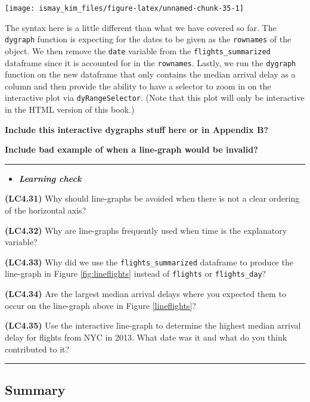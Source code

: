 \documentclass[]{tufte-book}
\newenvironment{rmdblock}[1]
  {\begin{shaded*}
  \begin{itemize}
  \renewcommand{\labelitemi}{
    \raisebox{-.7\height}[0pt][0pt]{
    }
  }
  \item
  }
  {
  \end{itemize}
  \end{shaded*}
  }
\newenvironment{learncheck}
  {\begin{rmdblock}{warning}}
  {\end{rmdblock}}
\begin{document}
\texttt{[image: ismay\_kim\_files/figure-latex/unnamed-chunk-35-1]}

The syntax here is a little different than what we have covered so far.
The \texttt{dygraph} function is expecting for the dates to be given as
the \texttt{rownames} of the object. We then remove the \texttt{date}
variable from the \texttt{flights\_summarized} dataframe since it is
accounted for in the \texttt{rownames}. Lastly, we run the
\texttt{dygraph} function on the new dataframe that only contains the
median arrival delay as a column and then provide the ability to have a
selector to zoom in on the interactive plot via
\texttt{dyRangeSelector}. (Note that this plot will only be interactive
in the HTML version of this book.)

\textbf{Include this interactive dygraphs stuff here or in Appendix B?}

\textbf{Include bad example of when a line-graph would be invalid?}

\begin{center}\rule{0.5\linewidth}{\linethickness}\end{center}

\begin{learncheck}
\textbf{\emph{Learning check}}
\end{learncheck}

\textbf{(LC4.31)} Why should line-graphs be avoided when there is not a
clear ordering of the horizontal axis?

\textbf{(LC4.32)} Why are line-graphs frequently used when time is the
explanatory variable?

\textbf{(LC4.33)} Why did we use the \texttt{flights\_summarized}
dataframe to produce the line-graph in Figure \ref{fig:lineflights}
instead of \texttt{flights} or \texttt{flights\_day}?

\textbf{(LC4.34)} Are the largest median arrival delays where you
expected them to occur on the line-graph above in Figure
\ref{lineflights}?

\textbf{(LC4.35)} Use the interactive line-graph to determine the
highest median arrival delay for flights from NYC in 2013. What date was
it and what do you think contributed to it?

\begin{center}\rule{0.5\linewidth}{\linethickness}\end{center}

\subsection{Summary}\label{summary-4}
\end{document}
